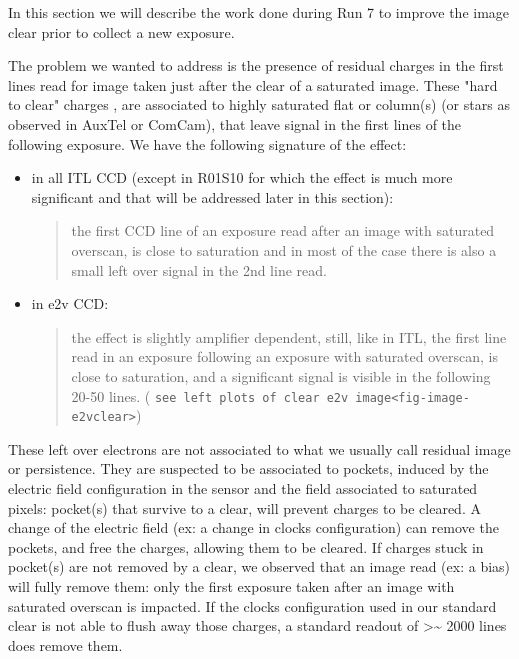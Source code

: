 In this section we will describe the work done during Run 7 to improve
the image clear prior to collect a new exposure.

The problem we wanted to address is the presence of residual charges in
the first lines read for image taken just after the clear of a saturated
image. These "hard to clear" charges , are associated to highly
saturated flat or column(s) (or stars as observed in AuxTel or ComCam),
that leave signal in the first lines of the following exposure. We have
the following signature of the effect:

\begin{itemize}
\item
  in all ITL CCD (except in R01\label{s10}{S10} for which
  the effect is much more significant and that will be addressed later
  in this section):

  \begin{quote}
  the first CCD line of an exposure read after an image with saturated
  overscan, is close to saturation and in most of the case there is also
  a small left over signal in the 2nd line read.
  \end{quote}
\item
  in e2v CCD:

  \begin{quote}
  the effect is slightly amplifier dependent, still, like in ITL, the
  first line read in an exposure following an exposure with saturated
  overscan, is close to saturation, and a significant signal is visible
  in the following 20-50 lines. (
  \texttt{see\ left\ plots\ of\ clear\ e2v\ image\textless{}fig-image-e2vclear\textgreater{}})
  \end{quote}
\end{itemize}

These left over electrons are not associated to what we usually call
residual image or persistence. They are suspected to be associated to
pockets, induced by the electric field configuration in the sensor and
the field associated to saturated pixels: pocket(s) that survive to a
clear, will prevent charges to be cleared. A change of the electric
field (ex: a change in clocks configuration) can remove the pockets, and
free the charges, allowing them to be cleared. If charges stuck in
pocket(s) are not removed by a clear, we observed that an image read
(ex: a bias) will fully remove them: only the first exposure taken after
an image with saturated overscan is impacted. If the clocks
configuration used in our standard clear is not able to flush away those
charges, a standard readout of \textgreater\textasciitilde{} 2000 lines
does remove them.

